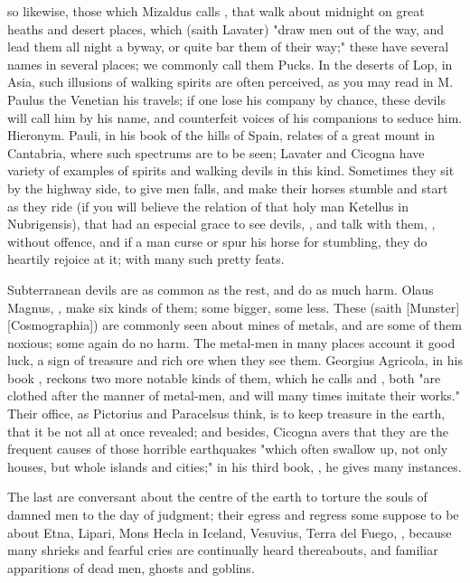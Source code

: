 so likewise, those which Mizaldus calls , that walk about
midnight on great heaths and desert places, which (saith
Lavater) "draw men out of the way, and lead them all night
a byway, or quite bar them of their way;" these have several names in several
places; we commonly call them Pucks. In the deserts of Lop, in Asia, such
illusions of walking spirits are often perceived, as you may read in M. Paulus
the Venetian his travels; if one lose his company by chance, these devils will
call him by his name, and counterfeit voices of his companions to seduce him.
Hieronym. Pauli, in his book of the hills of Spain, relates of a great
mount in Cantabria, where such spectrums are to be seen;
Lavater and Cicogna have variety of examples of spirits and walking devils in
this kind. Sometimes they sit by the highway side, to give men falls, and make
their horses stumble and start as they ride (if you will believe the relation
of that holy man Ketellus in Nubrigensis), that had an
especial grace to see devils, , and talk with
them, , without offence, and
if a man curse or spur his horse for stumbling, they do heartily rejoice at it;
with many such pretty feats.

Subterranean devils are as common as the rest, and do as much harm. Olaus
Magnus, , make six kinds of them; some
bigger, some less. These (saith
[Munster][Cosmographia]) are commonly
seen about mines of metals, and are some of them noxious; some again do no
harm. The metal-men in many places account it good luck, a sign of treasure and
rich ore when they see them. Georgius Agricola, in his book
, reckons two more
notable kinds of them, which he calls  and
, both "are clothed after the manner of metal-men, and will many
times imitate their works." Their office, as Pictorius and Paracelsus think, is
to keep treasure in the earth, that it be not all at once revealed; and
besides, Cicogna avers that they are the frequent causes
of those horrible earthquakes "which often swallow up, not only houses, but
whole islands and cities;" in his third book, ,
he gives many instances.

The last are conversant about the centre of the earth to torture the souls of
damned men to the day of judgment; their egress and regress some suppose to be
about Etna, Lipari, Mons Hecla in Iceland, Vesuvius, Terra del Fuego, \etc{},
because many shrieks and fearful cries are continually heard thereabouts, and
familiar apparitions of dead men, ghosts and goblins.

